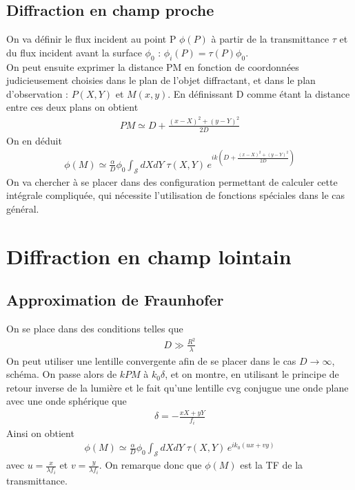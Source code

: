 \documentclass[12pt,prb,aps,epsf]{report}
\begin{document}
\subsection{Diffraction en champ proche}
On va définir le flux incident au point P $\phi(P)$ à partir de la transmittance $\tau$ et du flux incident avant la surface $\phi_0$ : $\phi_i(P)=\tau (P)\phi_0$.\\
On peut ensuite exprimer la distance PM en fonction de coordonnées judicieusement choisies dans le plan de l'objet diffractant, et dans le plan d'observation : $P(X,Y)$ et $M(x,y)$. En définissant D comme étant la distance entre ces deux plans on obtient 
\begin{eqnarray}
PM \simeq D + \frac{(x-X)^2+(y-Y)^2}{2D}
\end{eqnarray}
On en déduit 
\begin{eqnarray}
\phi(M) \simeq \frac{\alpha}{D} \phi_0 \int_{\mathcal{S}} dXdY\;\tau(X,Y)\, e^{ik (D + \frac{(x-X)^2+(y-Y)^2}{2D}) }
\end{eqnarray}
On va chercher à se placer dans des configuration permettant de calculer cette intégrale compliquée, qui nécessite l'utilisation de fonctions spéciales dans le cas général.
\section{Diffraction en champ lointain}
\subsection{Approximation de Fraunhofer}
On se place dans des conditions telles que 
\begin{eqnarray}
D \gg \frac{R^2}{\lambda}
\end{eqnarray}
On peut utiliser une lentille convergente afin de se placer dans le cas $D \rightarrow \infty$, schéma. On passe alors de $kPM$ à $k_0\delta$, et on montre, en utilisant le principe de retour inverse de la lumière et le fait qu'une lentille cvg conjugue une onde plane avec une onde sphérique que 
\begin{eqnarray}
\delta = -\frac{xX+yY}{f_i}
\end{eqnarray}
Ainsi on obtient 
\begin{eqnarray}
\phi(M) \simeq \frac{\alpha}{D} \phi_0 \int_{\mathcal{S}} dXdY\;\tau(X,Y)\, e^{ik_0 (ux + vy) }
\end{eqnarray}
avec $u = \frac{x}{\lambda f_i}$ et $v = \frac{y}{\lambda f_i}$. On remarque donc que $\phi(M)$ est la TF de la transmittance.
\end{document}
